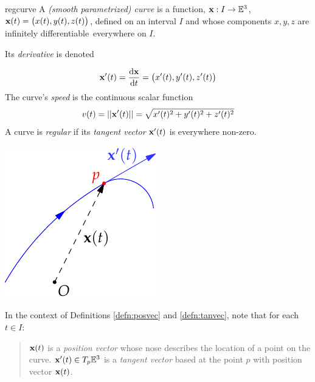 \clearpage




\begin{defn}{}{regcurve}
A \emph{(smooth parametrized) curve} is a function, $\vx:I\to\E^3$, $\vx(t)=\bigl(x(t),y(t),z(t)\bigr)$, defined on an interval $I$ and whose components $x,y,z$ are infinitely differentiable\footnotemark\ everywhere on $I$.\par
Its \emph{derivative} is denoted\par
\begin{minipage}[t]{0.7\linewidth}\vspace{-10pt}
\[\vx'(t)=\diff[\vx]{t}=\bigl(x'(t),y'(t),z'(t)\bigr)\]
The curve's \emph{speed} is the continuous scalar function 
\[v(t)=\Nm{\vx'(t)}=\sqrt{x'(t)^2+y'(t)^2+z'(t)^2}\]
A curve is \emph{regular} if its \emph{tangent vector} $\vx'(t)$ is everywhere non-zero. 
\end{minipage}\hfill\begin{minipage}[t]{0.29\linewidth}\vspace{0pt}
\flushright\includegraphics{curves-tangent-vector}
\end{minipage}
\end{defn}



In the context of Definitions \ref{defn:posvec} and \ref{defn:tanvec}, note that for each $t\in I$:
\begin{quote}
$\vx(t)$ is a \emph{position vector} whose nose describes the location of a point on the curve.\smallbreak
$\vx'(t)\in T_p\E^3$ is a \emph{tangent vector} based at the point $p$ with position vector $\vx(t)$.
\end{quote}

